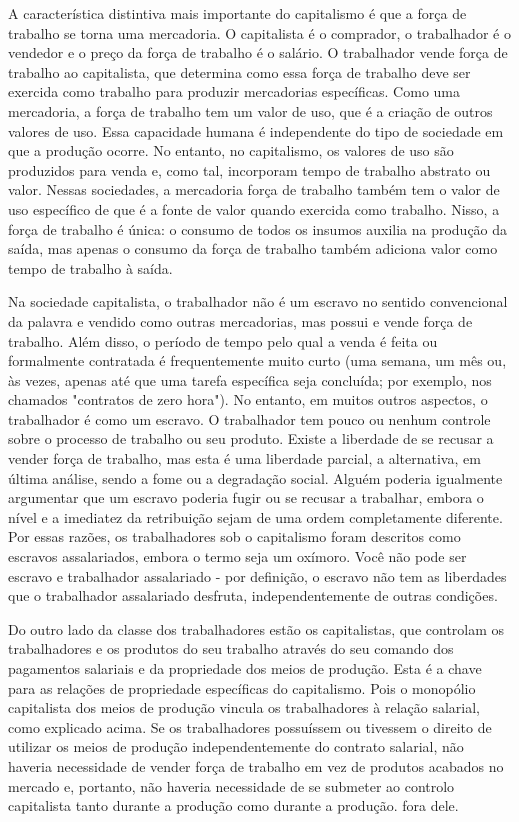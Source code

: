  \par 
A característica distintiva mais importante do capitalismo é que a força de trabalho se torna uma mercadoria. O capitalista é o comprador, o trabalhador é o vendedor e o preço da força de trabalho é o salário. O trabalhador vende força de trabalho ao capitalista, que determina como essa força de trabalho deve ser exercida como trabalho para produzir mercadorias específicas. Como uma mercadoria, a força de trabalho tem um valor de uso, que é a criação de outros valores de uso. Essa capacidade humana é independente do tipo de sociedade em que a produção ocorre. No entanto, no capitalismo, os valores de uso são produzidos para venda e, como tal, incorporam tempo de trabalho abstrato ou valor. Nessas sociedades, a mercadoria força de trabalho também tem o valor de uso específico de que é a fonte de valor quando exercida como trabalho. Nisso, a força de trabalho é única: o consumo de todos os insumos auxilia na produção da saída, mas apenas o consumo da força de trabalho também adiciona valor como tempo de trabalho à saída.
 \par 
Na sociedade capitalista, o trabalhador não é um escravo no sentido convencional da palavra e vendido como outras mercadorias, mas possui e vende força de trabalho. Além disso, o período de tempo pelo qual a venda é feita ou formalmente contratada é frequentemente muito curto (uma semana, um mês ou, às vezes, apenas até que uma tarefa específica seja concluída; por exemplo, nos chamados "contratos de zero hora"). No entanto, em muitos outros aspectos, o trabalhador é como um escravo. O trabalhador tem pouco ou nenhum controle sobre o processo de trabalho ou seu produto. Existe a liberdade de se recusar a vender força de trabalho, mas esta é uma liberdade parcial, a alternativa, em última análise, sendo a fome ou a degradação social. Alguém poderia igualmente argumentar que um escravo poderia fugir ou se recusar a trabalhar, embora o nível e a imediatez da retribuição sejam de uma ordem completamente diferente. Por essas razões, os trabalhadores sob o capitalismo foram descritos como escravos assalariados, embora o termo seja um oxímoro. Você não pode ser escravo e trabalhador assalariado - por definição, o escravo não tem as liberdades que o trabalhador assalariado desfruta, independentemente de outras condições.
 \par 
Do outro lado da classe dos trabalhadores estão os capitalistas, que controlam os trabalhadores e os produtos do seu trabalho através do seu comando dos pagamentos salariais e da propriedade dos meios de produção. Esta é a chave para as relações de propriedade específicas do capitalismo. Pois o monopólio capitalista dos meios de produção vincula os trabalhadores à relação salarial, como explicado acima. Se os trabalhadores possuíssem ou tivessem o direito de utilizar os meios de produção independentemente do contrato salarial, não haveria necessidade de vender força de trabalho em vez de produtos acabados no mercado e, portanto, não haveria necessidade de se submeter ao controlo capitalista tanto durante a produção como durante a produção. fora dele.
